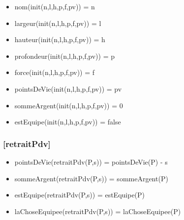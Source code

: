 \documentclass[11pt]{article}
\begin{document}
\begin{itemize}

\item nom(init(n,l,h,p,f,pv)) = n\\
\label{sec-1.7.2.1}


\item largeur(init(n,l,h,p,f,pv)) = l\\
\label{sec-1.7.2.2}


\item hauteur(init(n,l,h,p,f,pv)) = h\\
\label{sec-1.7.2.3}


\item profondeur(init(n,l,h,p,f,pv)) = p\\
\label{sec-1.7.2.4}


\item force(init(n,l,h,p,f,pv)) = f\\
\label{sec-1.7.2.5}


\item pointsDeVie(init(n,l,h,p,f,pv)) = pv\\
\label{sec-1.7.2.6}


\item sommeArgent(init(n,l,h,p,f,pv)) = 0\\
\label{sec-1.7.2.7}


\item estEquipe(init(n,l,h,p,f,pv)) = false\\
\label{sec-1.7.2.8}



\end{itemize} %
\subsubsection{[retraitPdv]}
\label{sec-1.7.3}

\begin{itemize}

\item pointsDeVie(retraitPdv(P,s)) = pointsDeVie(P) - s\\
\label{sec-1.7.3.1}


\item sommeArgent(retraitPdv(P,s)) = sommeArgent(P)\\
\label{sec-1.7.3.2}


\item estEquipe(retraitPdv(P,s)) = estEquipe(P)\\
\label{sec-1.7.3.3}


\item laChoseEquipee(retraitPdv(P,s)) = laChoseEquipee(P)\\
\label{sec-1.7.3.4}


\end{itemize} %
\end{document}

